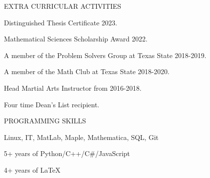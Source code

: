\documentclass{resume} %
\begin{document}
\begin{rSection}{EXTRA CURRICULAR ACTIVITIES}

\begin{rSubsection}{}{}{}{} 
\item Distinguished Thesis Certificate 2023.
\item Mathematical Sciences Scholarship Award 2022.
\item A member of the Problem Solvers Group at Texas State 2018-2019.
\item A member of the Math Club at Texas State 2018-2020.
\item Head Martial Arts Instructor from 2016-2018.
\item Four time Dean's List recipient.
\end{rSubsection}

\end{rSection}



\begin{rSection}{PROGRAMMING SKILLS} \itemsep -3pt  

\begin{rSubsection}{}{}{}{} 
\item Linux, IT, MatLab, Maple, Mathematica, SQL, Git
\item 5+ years of Python/C++/C\#/JavaScript
\item 4+ years of \LaTeX
\end{rSubsection}

\end{rSection} 
\end{document}
